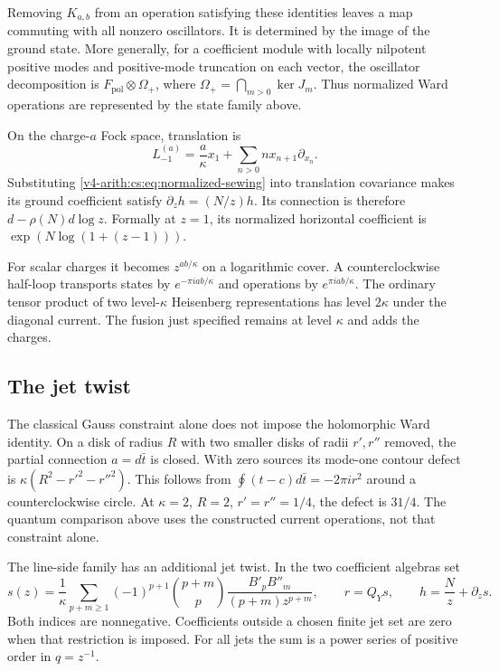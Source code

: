 Removing \(K_{a,b}\) from an operation satisfying these identities leaves a
map commuting with all nonzero oscillators. It is determined by the image of
the ground state. More generally, for a coefficient module with locally
nilpotent positive modes and positive-mode truncation on each vector, the
oscillator decomposition is \(F_{\mathrm{pol}}\otimes\Omega_+\), where
\(\Omega_+=\bigcap_{m>0}\ker J_m\). Thus normalized Ward operations are
represented by the state family above.

On the charge-\(a\) Fock space, translation is
\[
 L_{-1}^{(a)}=\frac a\kappa x_1+
                    \sum_{n>0}n x_{n+1}\partial_{x_n}.
\]
Substituting \eqref{v4-arith:cs:eq:normalized-sewing} into translation
covariance makes its ground coefficient satisfy \(\partial_z h=(N/z)h\). Its
connection is therefore \(d-\rho(N)d\log z\). Formally at \(z=1\), its
normalized horizontal coefficient is \(\exp(N\log(1+(z-1)))\).

For scalar charges it becomes \(z^{ab/\kappa}\) on a logarithmic cover. A
counterclockwise half-loop transports states by \(e^{-\pi iab/\kappa}\) and
operations by \(e^{\pi iab/\kappa}\). The ordinary tensor product of two
level-\(\kappa\) Heisenberg representations has level \(2\kappa\) under the
diagonal current. The fusion just specified remains at level \(\kappa\) and
adds the charges.

\subsection{The jet twist}

The classical Gauss constraint alone does not impose the holomorphic Ward
identity. On a disk of radius \(R\) with two smaller disks of radii
\(r',r''\) removed, the partial connection \(a=d\bar t\) is closed. With
zero sources its mode-one contour defect is \(\kappa(R^2-r'^2-r''^2)\). This
follows from \(\oint(t-c)d\bar t=-2\pi i r^2\) around a counterclockwise
circle. At \(\kappa=2\), \(R=2\), \(r'=r''=1/4\), the defect is \(31/4\).
The quantum comparison above uses the constructed current operations, not
that constraint alone.

The line-side family has an additional jet twist. In the two coefficient
algebras set
\begin{equation}
 s(z)=\frac1\kappa
   \sum_{p+m\ge1}(-1)^{p+1}\binom{p+m}{p}
       \frac{B'_pB''_m}{(p+m)z^{p+m}},
 \qquad r=Q_Ys,
 \qquad h=\frac Nz+\partial_zs.
 \label{v4-arith:cs:eq:jet-twist}
\end{equation}
Both indices are nonnegative. Coefficients outside a chosen finite jet set
are zero when that restriction is imposed. For all jets the sum is a power
series of positive order in \(q=z^{-1}\).

